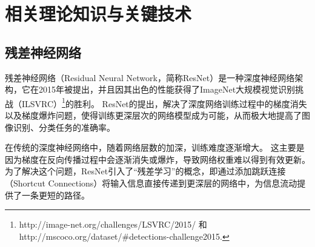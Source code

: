 \chapter{相关理论知识与关键技术}
\label{cha:basic-knowledge}




\section{残差神经网络}
残差神经网络（Residual Neural Network，简称ResNet）是一种深度神经网络架构，它在2015年被提出，并且因其出色的性能获得了ImageNet大规模视觉识别挑战（ILSVRC）\footnote{http://image-net.org/challenges/LSVRC/2015/ 和 http://mscoco.org/dataset/\#detections-challenge2015.}的胜利\cite{he2016deep}。
ResNet的提出，解决了深度网络训练过程中的梯度消失以及梯度爆炸问题，使得训练更深层次的网络模型成为可能，从而极大地提高了图像识别、分类任务的准确率。

在传统的深度神经网络中，随着网络层数的加深，训练难度逐渐增大。
这主要是因为梯度在反向传播过程中会逐渐消失或爆炸，导致网络权重难以得到有效更新。
为了解决这个问题，ResNet引入了“残差学习”的概念，即通过添加跳跃连接（Shortcut Connections）将输入信息直接传递到更深层的网络中，为信息流动提供了一条更短的路径。

